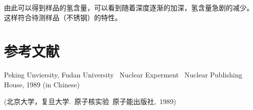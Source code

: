 \documentclass[a4paper,10.0pt,twoside]{npr}
\begin{document}
\begin{multicols}{2}
由此可以得到样品的氢含量，可以看到随着深度逐渐的加深，氢含量急剧的减少。这样符合待测样品（不锈钢）的特性。

\section{参考文献}

\noindent
[1] Peking Unviersity, Fudan University \ Nuclear Experment
\ Nuclear Publishing House, 1989 (in Chinese)

\noindent
 (北京大学，复旦大学.\ 原子核实验\ 原子能出版社,\ 1989)

\end{multicols}

\newpage

\clearpage
\end{document}
